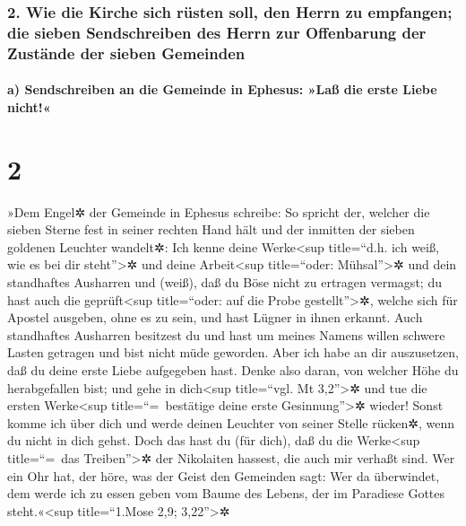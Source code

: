 \hypertarget{wie-die-kirche-sich-ruxfcsten-soll-den-herrn-zu-empfangen-die-sieben-sendschreiben-des-herrn-zur-offenbarung-der-zustuxe4nde-der-sieben-gemeinden}{%
\subsubsection{2. Wie die Kirche sich rüsten soll, den Herrn zu
empfangen; die sieben Sendschreiben des Herrn zur Offenbarung der
Zustände der sieben
Gemeinden}\label{wie-die-kirche-sich-ruxfcsten-soll-den-herrn-zu-empfangen-die-sieben-sendschreiben-des-herrn-zur-offenbarung-der-zustuxe4nde-der-sieben-gemeinden}}

\hypertarget{a-sendschreiben-an-die-gemeinde-in-ephesus-lauxdf-die-erste-liebe-nicht}{%
\paragraph{a) Sendschreiben an die Gemeinde in Ephesus: »Laß die erste
Liebe
nicht!«}\label{a-sendschreiben-an-die-gemeinde-in-ephesus-lauxdf-die-erste-liebe-nicht}}

\hypertarget{section-1}{%
\section{2}\label{section-1}}

 »Dem Engel✲ der Gemeinde in Ephesus schreibe: So spricht
der, welcher die sieben Sterne fest in seiner rechten Hand hält und der
inmitten der sieben goldenen Leuchter wandelt✲:  Ich kenne
deine Werke\textless sup title=``d.h. ich weiß, wie es bei dir
steht''\textgreater✲ und deine Arbeit\textless sup title=``oder:
Mühsal''\textgreater✲ und dein standhaftes Ausharren und (weiß), daß du
Böse nicht zu ertragen vermagst; du hast auch die geprüft\textless sup
title=``oder: auf die Probe gestellt''\textgreater✲, welche sich für
Apostel ausgeben, ohne es zu sein, und hast Lügner in ihnen erkannt.
 Auch standhaftes Ausharren besitzest du und hast um
meines Namens willen schwere Lasten getragen und bist nicht müde
geworden.  Aber ich habe an dir auszusetzen, daß du deine
erste Liebe aufgegeben hast.  Denke also daran, von
welcher Höhe du herabgefallen bist; und gehe in dich\textless sup
title=``vgl. Mt 3,2''\textgreater✲ und tue die ersten Werke\textless sup
title=``=~bestätige deine erste Gesinnung''\textgreater✲ wieder! Sonst
komme ich über dich und werde deinen Leuchter von seiner Stelle rücken✲,
wenn du nicht in dich gehst.  Doch das hast du (für dich),
daß du die Werke\textless sup title=``=~das Treiben''\textgreater✲ der
Nikolaiten hassest, die auch mir verhaßt sind.  Wer ein
Ohr hat, der höre, was der Geist den Gemeinden sagt: Wer da überwindet,
dem werde ich zu essen geben vom Baume des Lebens, der im Paradiese
Gottes steht.«\textless sup title=``1.Mose 2,9; 3,22''\textgreater✲


